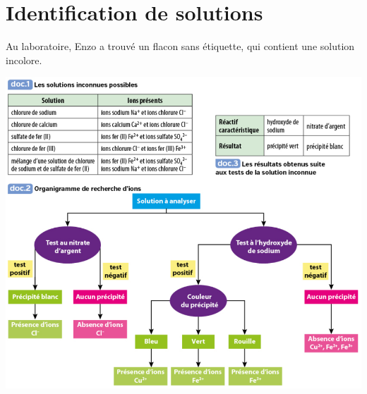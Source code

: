 \section{Identification de solutions}

Au laboratoire, Enzo a trouvé un flacon sans étiquette, qui contient une solution incolore. 

\begin{center}
	\includegraphics[scale=0.6]{img/docs}
\end{center}

